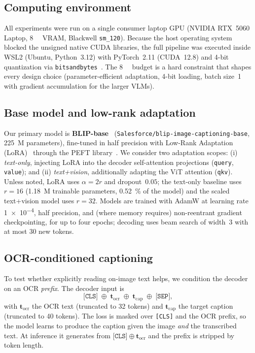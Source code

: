 \subsection{Computing environment}
\label{sec:env}
All experiments were run on a single consumer laptop GPU (NVIDIA RTX~5060 Laptop,
\SI{8}{\giga\byte} VRAM, Blackwell \texttt{sm\_120}). Because the host operating
system blocked the unsigned native CUDA libraries, the full pipeline was executed
inside WSL2 (Ubuntu, Python~3.12) with PyTorch~2.11 (CUDA~12.8) and 4-bit
quantization via \texttt{bitsandbytes}~\cite{bitsandbytes}. The \SI{8}{\giga\byte}
budget is a hard constraint that shapes every design choice (parameter-efficient
adaptation, 4-bit loading, batch size~1 with gradient accumulation for the larger
VLMs).

\subsection{Base model and low-rank adaptation}
\label{sec:lora}
Our primary model is \textbf{BLIP-base}~\cite{blip}
(\texttt{Salesforce/blip-image-captioning-base}, \SI{225}{M} parameters),
fine-tuned in half precision with Low-Rank Adaptation (LoRA)~\cite{lora} through
the PEFT library~\cite{peft}. We consider two adaptation scopes: (i) \emph{text-only},
injecting LoRA into the decoder self-attention projections (\texttt{query},
\texttt{value}); and (ii) \emph{text+vision}, additionally adapting the ViT
attention (\texttt{qkv}). Unless noted, LoRA uses $\alpha{=}2r$ and dropout~$0.05$;
the text-only baseline uses $r{=}16$ (\SI{1.18}{M} trainable parameters,
\SI{0.52}{\percent} of the model) and the scaled text+vision model uses $r{=}32$.
Models are trained with AdamW at learning rate \num{1e-4}, half precision, and
(where memory requires) non-reentrant gradient checkpointing, for up to four
epochs; decoding uses beam search of width~3 with at most \num{30} new tokens.

\subsection{OCR-conditioned captioning}
\label{sec:ocr}
To test whether explicitly reading on-image text helps, we condition the decoder
on an OCR \emph{prefix}. The decoder input is
\begin{equation}
\texttt{[CLS]} \;\oplus\; \mathbf{t}_{\text{ocr}} \;\oplus\;
\mathbf{t}_{\text{cap}} \;\oplus\; \texttt{[SEP]},
\end{equation}
with $\mathbf{t}_{\text{ocr}}$ the OCR text (truncated to \num{32} tokens) and
$\mathbf{t}_{\text{cap}}$ the target caption (truncated to \num{40} tokens). The
loss is masked over \texttt{[CLS]} and the OCR prefix, so the model learns to
produce the caption given the image \emph{and} the transcribed text. At inference
it generates from $\texttt{[CLS]}\oplus\mathbf{t}_{\text{ocr}}$ and the prefix is
stripped by token length.

